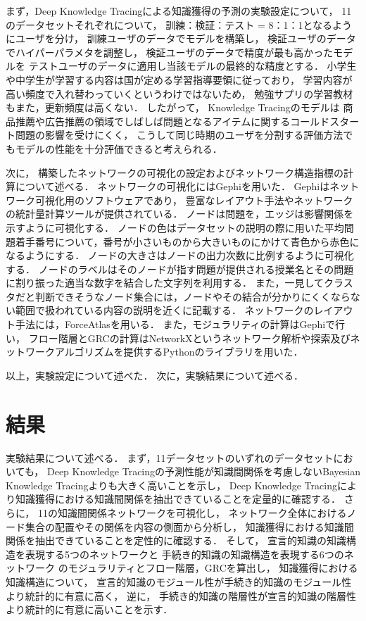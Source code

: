まず，Deep Knowledge Tracingによる知識獲得の予測の実験設定について，
11のデータセットそれぞれについて，
訓練：検証：テスト = 8：1：1となるようにユーザを分け，
訓練ユーザのデータでモデルを構築し，
検証ユーザのデータでハイパーパラメタを調整し， 
検証ユーザのデータで精度が最も高かったモデルを
テストユーザのデータに適用し当該モデルの最終的な精度とする．
小学生や中学生が学習する内容は国が定める学習指導要領\cite{gakushushidouyouryou}に従っており，
学習内容が高い頻度で入れ替わっていくというわけではないため，
勉強サプリの学習教材もまた，更新頻度は高くない．
したがって，
Knowledge Tracingのモデルは
商品推薦や広告推薦の領域でしばしば問題となるアイテムに関するコールドスタート問題\cite{schein2002methods}の影響を受けにくく，
こうして同じ時期のユーザを分割する評価方法でもモデルの性能を十分評価できると考えられる．


次に，
構築したネットワークの可視化の設定およびネットワーク構造指標の計算について述べる．
ネットワークの可視化にはGephi\cite{bastian2009gephi}を用いた．
Gephiはネットワーク可視化用のソフトウェアであり，
豊富なレイアウト手法やネットワークの統計量計算ツールが提供されている．
ノードは問題を，エッジは影響関係を示すように可視化する．
ノードの色はデータセットの説明の際に用いた平均問題着手番号について，番号が小さいものから大きいものにかけて青色から赤色になるようにする．
ノードの大きさはノードの出力次数に比例するように可視化する．
ノードのラベルはそのノードが指す問題が提供される授業名とその問題に割り振った適当な数字を結合した文字列を利用する．
また，一見してクラスタだと判断できそうなノード集合には，ノードやその結合が分かりにくくならない範囲で扱われている内容の説明を近くに記載する．
ネットワークのレイアウト手法には，ForceAtlas\cite{jacomy2009force}を用いる．
また，モジュラリティの計算はGephiで行い，
フロー階層とGRCの計算はNetworkX\cite{hagberg-2008-exploring}というネットワーク解析や探索及びネットワークアルゴリズムを提供するPythonのライブラリを用いた．



以上，実験設定について述べた．
次に，実験結果について述べる．


\section{結果}
実験結果について述べる．
まず，11データセットのいずれのデータセットにおいても，
Deep Knowledge Tracingの予測性能が知識間関係を考慮しないBayesian Knowledge Tracingよりも大きく高いことを示し，
Deep Knowledge Tracingにより知識獲得における知識間関係を抽出できていることを定量的に確認する．
さらに，
11の知識間関係ネットワークを可視化し，
ネットワーク全体におけるノード集合の配置やその関係を内容の側面から分析し，
知識獲得における知識間関係を抽出できていることを定性的に確認する．
そして，
宣言的知識の知識構造を表現する5つのネットワークと
手続き的知識の知識構造を表現する6つのネットワーク
のモジュラリティとフロー階層，GRCを算出し，
知識獲得における知識構造について，
宣言的知識のモジュール性が手続き的知識のモジュール性より統計的に有意に高く，
逆に，
手続き的知識の階層性が宣言的知識の階層性より統計的に有意に高いことを示す．


